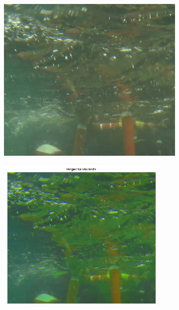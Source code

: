 \documentclass{article}
\begin{document}
\begin{figure}[H]
	\begin{subfigure}{0.5\textwidth}
	\centering
        \includegraphics[scale=0.5]{1908iv.png}
    \end{subfigure}\hfill
	\begin{subfigure}{0.5\textwidth}
	\centering
        \includegraphics[width=0.9\textwidth]{1098iv-transformada-20-2x-log.png}
    \end{subfigure}\hfill
\end{figure}\hfill
\end{document}
